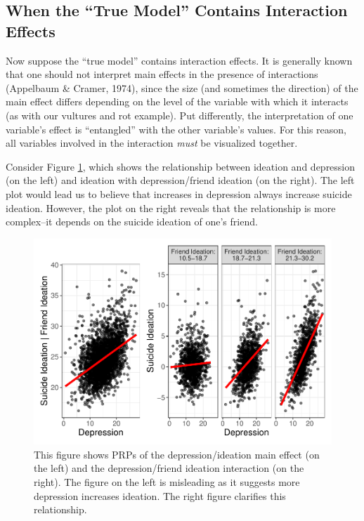 \documentclass[
  man,floatsintext]{apa6}
\begin{document}
\subsection{When the ``True Model'' Contains Interaction Effects}\label{when-the-true-model-contains-interaction-effects}

Now suppose the ``true model'' contains interaction effects. It is generally known that one should not interpret main effects in the presence of interactions (Appelbaum \& Cramer, 1974), since the size (and sometimes the direction) of the main effect differs depending on the level of the variable with which it interacts (as with our vultures and rot example). Put differently, the interpretation of one variable's effect is ``entangled'' with the other variable's values. For this reason, all variables involved in the interaction \emph{must} be visualized together.

Consider Figure \ref{fig:interactionPrp}, which shows the relationship between ideation and depression (on the left) and ideation with depression/friend ideation (on the right). The left plot would lead us to believe that increases in depression always increase suicide ideation. However, the plot on the right reveals that the relationship is more complex--it depends on the suicide ideation of one's friend.

\begin{figure}
\includegraphics[width=0.9\linewidth]{visual_partitions_files/figure-latex/interactionPrp-1} \caption{This figure shows PRPs of the depression/ideation main effect (on the left) and the depression/friend ideation interaction (on the right). The figure on the left is misleading as it suggests more depression increases ideation. The right figure clarifies this relationship.}\label{fig:interactionPrp}
\end{figure}
\end{document}
